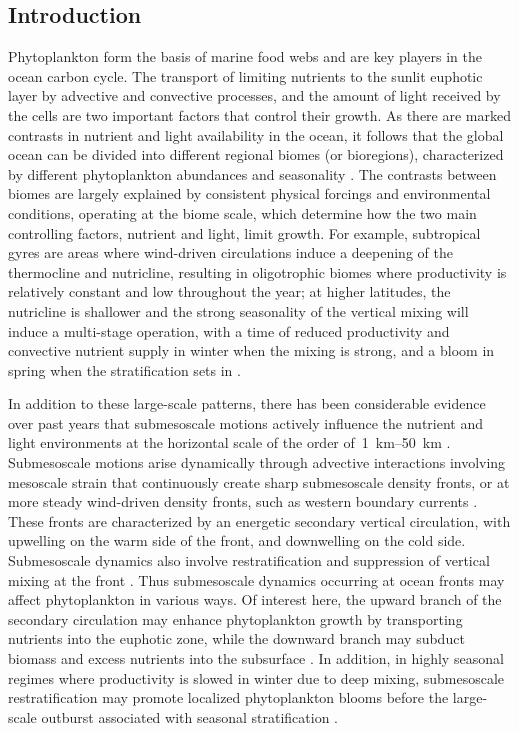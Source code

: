 \subsection{Introduction}

Phytoplankton form the basis of marine food webs and are key players in the ocean carbon cycle.
The transport of limiting nutrients to the sunlit euphotic layer by advective and convective processes, and the amount of light received by the cells  are two important factors that control their growth.
As there are marked contrasts in nutrient and light availability in the ocean, it follows that the global ocean can be divided into different regional biomes (or bioregions), characterized by different phytoplankton abundances and seasonality \parencite{longhurst_2007, vichi_2011a, bock_2022}.
The contrasts between biomes are largely explained by consistent physical forcings and environmental conditions, operating at the biome scale, which determine how the two main controlling factors, nutrient and light, limit growth.
For example, subtropical gyres are areas where wind-driven circulations induce a deepening of the thermocline and nutricline, resulting in oligotrophic biomes where productivity is relatively constant and low throughout the year; at higher latitudes, the nutricline is shallower and the strong seasonality of the vertical mixing will induce a multi-stage operation, with a time of reduced productivity and convective nutrient supply in winter when the mixing is strong, and a bloom in spring when the stratification sets in \parencite{wilson_2005, williams_2011}.

In addition to these large-scale patterns, there has been considerable evidence over past years that submesoscale motions actively influence the nutrient and light environments at the horizontal scale of the order of~\qtyrange{1}{50}{\km} \parencite[see reviews by][]{levy_2012, mahadevan_2016, levy_2018}.
Submesoscale motions arise dynamically through advective interactions involving mesoscale strain that continuously create sharp submesoscale density fronts, or at more steady wind-driven density fronts, such as western boundary currents \parencite{thomas_2008, mcwilliams_2016, mahadevan_2020}.
These fronts are characterized by an energetic secondary vertical circulation, with upwelling on the warm side of the front, and downwelling on the cold side.
Submesoscale dynamics also involve restratification and suppression of vertical mixing at the front \parencite{thomas_2008a}.
Thus submesoscale dynamics occurring at ocean fronts may affect phytoplankton in various ways.
Of interest here, the upward branch of the secondary circulation may enhance phytoplankton growth by transporting nutrients into the euphotic zone, while the downward branch may subduct biomass and excess nutrients into the subsurface \parencite{calil_2011, omand_2015, hauschildt_2021}.
In addition, in highly seasonal regimes where productivity is slowed in winter due to deep mixing, submesoscale restratification may promote localized phytoplankton blooms before the large-scale outburst associated with seasonal stratification \parencite{mahadevan_2012}.

